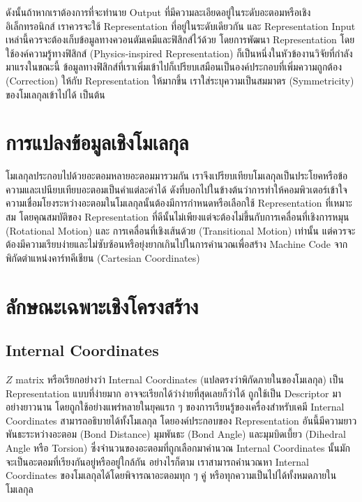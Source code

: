 ดังนั้นถ้าหากเราต้องการที่จะทำนาย Output ที่มีความละเอียดอยู่ในระดับอะตอมหรือเชิงอิเล็กทรอนิกส์ เราควรจะใช้ Representation ที่อยู่ในระดับเดียวกัน 
และ Representation Input เหล่านี้ควรจะต้องเก็บข้อมูลทางควอนตัมเคมีและฟิสิกส์ไว้ด้วย โดยการพัฒนา Representation โดยใช้องค์ความรู้ทางฟิสิกส์
(Physics-inspired Representation) ก็เป็นหนึ่งในหัวข้องานวิจัยที่กำลังมาแรงในขณะนี้ ข้อมูลทางฟิสิกส์ที่เราเพิ่มเข้าไปก็เปรียบเสมือนเป็นองค์ประกอบที่เพิ่มความถูกต้อง
(Correction) ให้กับ Representation ให้มากขึ้น เราใส่ระบุความเป็นสมมาตร (Symmetricity) ของโมเลกุลเข้าไปได้ เป็นต้น 

\section{การแปลงข้อมูลเชิงโมเลกุล}

โมเลกุลประกอบไปด้วยอะตอมหลายอะตอมมารวมกัน เราจึงเปรียบเทียบโมเลกุลเป็นประโยคหรือข้อความและเปนียบเทียบอะตอมเป็นคำแต่ละคำได้
ดังที่บอกไปในข้างต้นว่าการทำให้คอมพิวเตอร์เข้าใจความเชื่อมโยงระหว่างอะตอมในโมเลกุลนั้นต้องมีการกำหนดหรือเลือกใช้ Representation ที่เหมาะสม
โดยคุณสมบัติของ Representation ที่ดีนั้นไม่เพียงแต่จะต้องไม่ขึ้นกับการเคลื่อนที่เชิงการหมุน (Rotational Motion) และ การเคลื่อนที่เชิงเส้นด้วย (Transitional Motion) เท่านั้น 
แต่ควรจะต้องมีความเรียบง่ายและไม่ซับซ้อนหรือยุ่งยากเกินไปในการคำนวณเพื่อสร้าง Machine Code จากพิกัดตำแหน่งคาร์ทคีเชียน (Cartesian Coordinates)

\section{ลักษณะเฉพาะเชิงโครงสร้าง}

\subsection{Internal Coordinates}

$Z$ matrix หรือเรียกอย่างว่า Internal Coordinates (แปลตรงว่าพิกัดภายในของโมเลกุล) เป็น Representation แบบที่ง่ายมาก 
อาจจะเรียกได้ว่าง่ายที่สุดเลยก็ว่าได้ ถูกใช้เป็น Descriptor มาอย่างยาวนาน โดยถูกใช้อย่างแพร่หลายในยุคแรก ๆ ของการเรียนรู้ของเครื่องสำหรับเคมี
Internal Coordinates สามารถอธิบายได้ทั้งโมเลกุล โดยองค์ประกอบของ Representation อันนี้มีความยาวพันธะระหว่างอะตอม (Bond Distance) 
มุมพันธะ (Bond Angle) และมุมบิดเบี้ยว (Dihedral Angle หรือ Torsion) ซึ่งจำนวนของอะตอมที่ถูกเลือกมาคำนวณ Internal Coordinates 
นั้นมักจะเป็นอะตอมที่เรียงกันอยู่หรืออยู่ใกล้กัน อย่างไรก็ตาม เราสามารถคำนวณหา Internal Coordinates ของโมเลกุลได้โดยพิจารณาอะตอมทุก ๆ คู่
หรือทุกความเป็นไปได้ทั้งหมดภายในโมเลกุล

